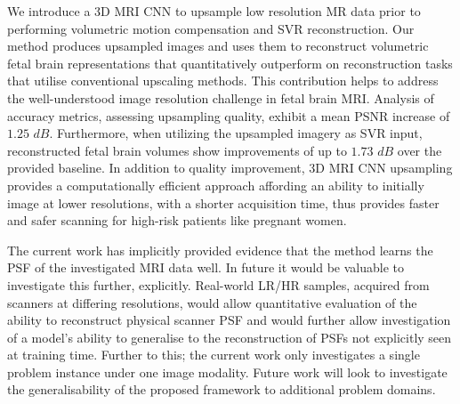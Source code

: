 \documentclass[runningheads,a4paper]{llncs}
\makeatletter
\newcommand{\todo}[1]{}
\renewcommand{\todo}[1]{{\color{red} TODO: {#1}}}
\let\origsection\section
\renewcommand\section{\@ifstar{\starsection}{\nostarsection}}
\newcommand\nostarsection[1]
{\sectionprelude\origsection{#1}\sectionpostlude}
\newcommand\starsection[1]
{\sectionprelude\origsection*{#1}\sectionpostlude}
\newcommand\sectionprelude{%
  \vspace{-2mm}
}
\newcommand\sectionpostlude{%
  \vspace{0mm}
}
\makeatother
\begin{document}
\label{sec:conclusion}
\vspace{-2mm}
\section{Discussion and Conclusion}
\vspace{-1mm}
We introduce a 3D MRI CNN to upsample low resolution MR data prior to performing volumetric motion compensation and SVR reconstruction.
Our method produces upsampled images and uses them to reconstruct volumetric fetal brain representations that quantitatively outperform on reconstruction tasks that utilise conventional upscaling methods. This contribution helps to address the well-understood image resolution challenge in fetal brain MRI. Analysis of accuracy metrics, assessing upsampling quality, exhibit a mean PSNR increase of $1.25$ $dB$. Furthermore, when utilizing the upsampled imagery as SVR input, reconstructed fetal brain volumes show improvements of up to $1.73$ $dB$ over the provided baseline. In addition to quality improvement, 3D MRI CNN upsampling provides a computationally efficient approach affording an ability to initially image at lower resolutions, with a shorter acquisition time, thus provides faster and safer scanning for high-risk patients like pregnant women.

The current work has implicitly provided evidence that the method learns the PSF of the investigated MRI data well. In future it would be valuable to investigate this further, explicitly. Real-world LR/HR samples, acquired from scanners at differing resolutions, would allow quantitative evaluation of the ability to reconstruct physical scanner PSF and would further allow investigation of a model's ability to generalise to the reconstruction of PSFs not explicitly seen at training time. Further to this; the current work only investigates a single problem instance under one image modality. Future work will look to investigate the generalisability of the proposed framework to additional problem domains.





\end{document}
